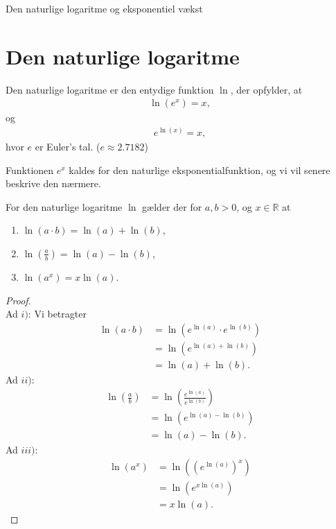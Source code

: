 \begin{center}
\Huge
Den naturlige logaritme og eksponentiel vækst
\end{center}

\section*{Den naturlige logaritme}
\begin{defn}
Den naturlige logaritme er den entydige funktion $\ln$, der opfylder, at
\begin{align*}
\ln(e^x) = x, 
\end{align*}
og
\begin{align*}
e^{\ln(x)} = x,
\end{align*}
hvor $e$ er Euler's tal. ($e \approx 2.7182$)
\end{defn}
Funktionen $e^x$ kaldes for den naturlige eksponentialfunktion, og vi vil senere beskrive den nærmere.

\begin{setn}
For den naturlige logaritme $\ln$ gælder der for $a,b>0$, og $x\in \mathbb{R}$ at
\begin{enumerate}[label=\roman*)]
\item $\ln(a\cdot b) = \ln(a) + \ln(b)$,
\item $\ln(\frac{a}{b}) = \ln(a)-\ln(b)$,
\item $\ln(a^x) = x\ln(a)$.
\end{enumerate}
\end{setn}
\begin{proof}
\phantom{hej} \\
Ad $i)$: Vi betragter
\begin{align*}
\ln(a\cdot b) &= \ln(e^{\ln(a)}\cdot e^{\ln(b)})\\
&= \ln(e^{\ln(a)+\ln(b)}) \\
&= \ln(a) + \ln(b).
\end{align*}
Ad $ii)$: 
\begin{align*}
\ln\left(\frac{a}{b}\right) &= \ln\left(\frac{e^{\ln(a)}}{e^{\ln(b)}}\right)\\
&= \ln\left(e^{\ln(a)-\ln(b)}\right)\\
&= \ln(a)-\ln(b).
\end{align*}
Ad $iii)$:
\begin{align*}
\ln(a^x) &= \ln\left(\left(e^{\ln(a)}\right)^x\right)\\
&= \ln\left(e^{x\ln(a)} \right)\\
&= x\ln(a).
\end{align*}
\end{proof}

